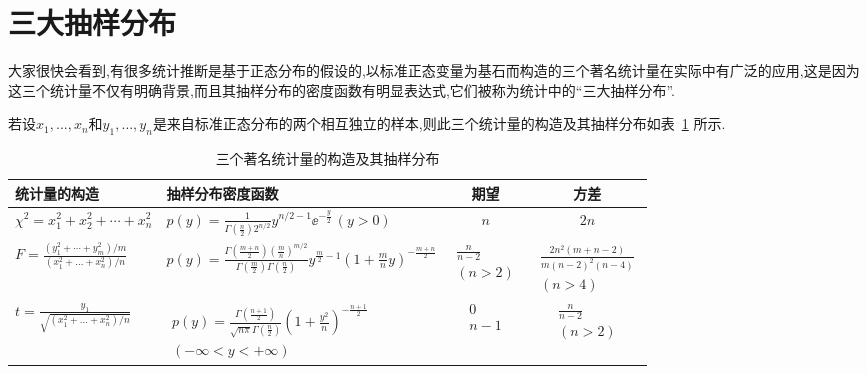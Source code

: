 \section{三大抽样分布\label{sec:5.4}}
大家很快会看到,有很多统计推断是基于正态分布的假设的,以标准正态变量为基石而构造的三个著名统计量在实际中有广泛的应用,这是因为这三个统计量不仅有明确背景,而且其抽样分布的密度函数有明显表达式,它们被称为统计中的``三大抽样分布''.

若设$x_1,\dotsc,x_n$和$y_1,\dotsc,y_n$是来自标准正态分布的两个相互独立的样本,则此三个统计量的构造及其抽样分布如表~\ref{tab:5.4.1} 所示.
\begin{table}[!ht]
  \centering
  \caption{三个著名统计量的构造及其抽样分布}\label{tab:5.4.1}
\begin{tabularx}{\textwidth}{p{4cm}p{6.5cm}cc}
\toprule
统计量的构造&抽样分布密度函数&期望&方差\\
\midrule
$\chi^2=x_1^2+x_2^2+\dotsb+x_n^2$&$p(y)=\frac1{\Gamma\left(\frac n2\right)2^{n/2}}
y^{n/2-1}\ee^{-\frac y2}\,(y>0)$&$n$&$2n$\\
$F=\frac{(y_1^2+\dotsb+y_m^2)/m}{(x_1^2+\dotsc+x_n^2)/n}$&
$p(y)=\frac{\Gamma\left(\frac{m+n}2\right)\left(\frac mn\right)^{m/2}}
{\Gamma\left(\frac m2\right)\Gamma\left(\frac n2\right)}y^{\frac m2-1}
\left(1+\frac mny\right)^{-\frac{m+n}2}$
&\parbox{1.2cm}{$\begin{matrix}\frac{n}{n-2}\\(n>2)\end{matrix}$}
&$\begin{matrix}\frac{2n^2(m+n-2)}{m(n-2)^2(n-4)}\\(n>4)\end{matrix}$\\
$t=\frac{y_1}{\sqrt{(x_1^2+\dotsc+x_n^2)/n}}$&\parbox{6.5cm}{
$\begin{matrix}p(y)=\frac{\Gamma\left(\frac{n+1}2\right)}
{\sqrt{n\pi}\Gamma\left(\frac n2\right)}\left(1+\frac{y^2}n\right)^{-\frac{n+1}2}\\
(-\infty<y<+\infty)
\end{matrix}$}&$\begin{matrix}0\\n-1\end{matrix}$
&$\begin{matrix}\frac n{n-2}\\(n>2)\end{matrix}$\\
\bottomrule
\end{tabularx}
\end{table}

